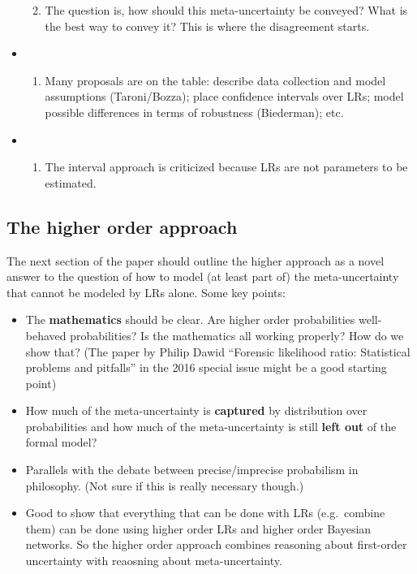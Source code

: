 \documentclass[
  10pt,
  dvipsnames,enabledeprecatedfontcommands]{scrartcl}
\providecommand{\tightlist}{%
  \setlength{\itemsep}{0pt}\setlength{\parskip}{0pt}}
\begin{document}
\begin{itemize}
  \begin{enumerate}
  \def\labelenumi{(\roman{enumi})}
  \setcounter{enumi}{2}
  \tightlist
  \item
    The question is, how should this meta-uncertainty be conveyed? What
    is the best way to convey it? This is where the disagreement starts.
  \end{enumerate}
\item
  \begin{enumerate}
  \def\labelenumi{(\roman{enumi})}
  \setcounter{enumi}{3}
  \tightlist
  \item
    Many proposals are on the table: describe data collection and model
    assumptions (Taroni/Bozza); place confidence intervals over LRs;
    model possible differences in terms of robustness (Biederman); etc.
  \end{enumerate}
\item
  \begin{enumerate}
  \def\labelenumi{(\alph{enumi})}
  \setcounter{enumi}{21}
  \tightlist
  \item
    The interval approach is criticized because LRs are not parameters
    to be estimated.
  \end{enumerate}
\end{itemize}

\hypertarget{the-higher-order-approach}{%
\subsection{The higher order approach}\label{the-higher-order-approach}}

The next section of the paper should outline the higher approach as a
novel answer to the question of how to model (at least part of) the
meta-uncertainty that cannot be modeled by LRs alone. Some key points:

\begin{itemize}
\item
  The \textbf{mathematics} should be clear. Are higher order
  probabilities well-behaved probabilities? Is the mathematics all
  working properly? How do we show that? (The paper by Philip Dawid
  ``Forensic likelihood ratio: Statistical problems and pitfalls'' in
  the 2016 special issue might be a good starting point)
\item
  How much of the meta-uncertainty is \textbf{captured} by distribution
  over probabilities and how much of the meta-uncertainty is still
  \textbf{left out} of the formal model?
\item
  Parallels with the debate between precise/imprecise probabilism in
  philosophy. (Not sure if this is really necessary though.)
\item
  Good to show that everything that can be done with LRs (e.g.~combine
  them) can be done using higher order LRs and higher order Bayesian
  networks. So the higher order approach combines reasoning about
  first-order uncertainty with reaosning about meta-uncertainty.
\end{itemize}
\end{document}
